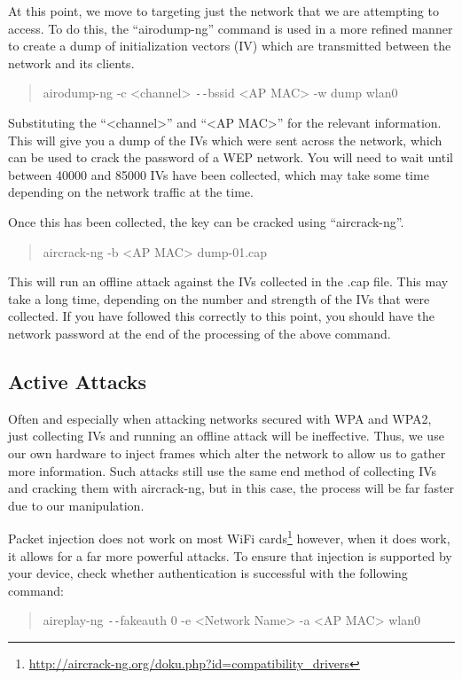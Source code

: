 \documentclass[a4paper,11pt]{report}
\begin{document}
			At this point, we move to targeting just the network that we are attempting to access. 
			To do this, the ``airodump-ng'' command is used in a more refined manner to create a dump of initialization vectors (IV) which are transmitted between the network and its clients. 
			\begin{quote}
				airodump-ng -c <channel> \verb+--+bssid <AP MAC> -w dump wlan0
			\end{quote}
			Substituting the ``<channel>'' and ``<AP MAC>'' for the relevant information. 
			This will give you a dump of the IVs which were sent across the network, which can be used to crack the password of a WEP network. 
			You will need to wait until between 40000 and 85000 IVs have been collected, which may take some time depending on the network traffic at the time. 
			
			Once this has been collected, the key can be cracked using ``aircrack-ng''.
			\begin{quote}
				aircrack-ng -b <AP MAC> dump-01.cap
			\end{quote}
			This will run an offline attack against the IVs collected in the .cap file.
			This may take a long time, depending on the number and strength of the IVs that were collected.
			If you have followed this correctly to this point, you should have the network password at the end of the processing of the above command. 
		\subsection{Active Attacks}
			Often and especially when attacking networks secured with WPA and WPA2, just collecting IVs and running an offline attack will be ineffective. 
			Thus, we use our own hardware to inject frames which alter the network to allow us to gather more information. 
			Such attacks still use the same end method of collecting IVs and cracking them with aircrack-ng, but in this case, the process will be far faster due to our manipulation. 

			Packet injection does not work on most WiFi cards\footnote{\url{http://aircrack-ng.org/doku.php?id=compatibility\_drivers}}
			however, when it does work, it allows for a far more powerful attacks. 
			To ensure that injection is supported by your device, check whether authentication is successful with the following command:
			\begin{quote}
				aireplay-ng \verb+--+fakeauth 0 -e <Network Name> -a <AP MAC> wlan0
			\end{quote}
\end{document}
